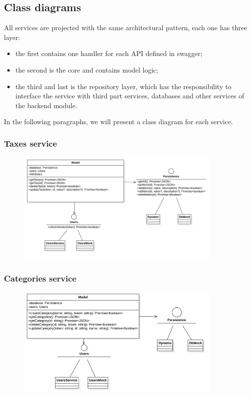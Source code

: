 \subsection{Class diagrams}\label{_classDiagram}
All services are projected with the same architectural pattern, each one has three layer:
\begin{itemize}
    \item the first contains one handler for each API defined in swagger;
    \item the second is the core and contains model logic;
    \item the third and last is the repository layer, which has the responsibility to interface the
          service with third part services, databases and other services of the backend module.
\end{itemize}
In the following paragraphs, we will present a class diagram for each service.

\subsubsection{Taxes service}
\begin{figure}[H]
    \includegraphics[width=0.9\textwidth]{res/images/class-diagrams/taxes.png}
\end{figure}

\subsubsection{Categories service}
\begin{figure}[H]
    \includegraphics[width=0.9\textwidth]{res/images/class-diagrams/categories.png}
\end{figure}

